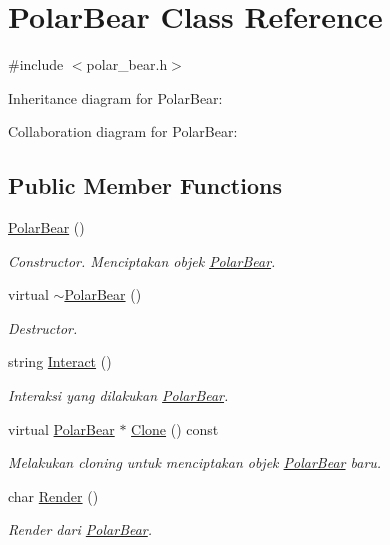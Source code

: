 \hypertarget{classPolarBear}{}\section{Polar\+Bear Class Reference}
\label{classPolarBear}


{\ttfamily \#include $<$polar\+\_\+bear.\+h$>$}



Inheritance diagram for Polar\+Bear\+:


Collaboration diagram for Polar\+Bear\+:
\subsection*{Public Member Functions}
\begin{DoxyCompactItemize}
\item 
\hyperlink{classPolarBear_a646f53f9fa472dcc7873e6a912cbc474}{Polar\+Bear} ()
\begin{DoxyCompactList}\small\item\em Constructor. Menciptakan objek \hyperlink{classPolarBear}{Polar\+Bear}. \end{DoxyCompactList}\item 
virtual \hyperlink{classPolarBear_a84e510e1476910f33cbb0bbe2fff3566}{$\sim$\+Polar\+Bear} ()
\begin{DoxyCompactList}\small\item\em Destructor. \end{DoxyCompactList}\item 
string \hyperlink{classPolarBear_a2c266e69dd929ac3b10fe7484a77a5a4}{Interact} ()
\begin{DoxyCompactList}\small\item\em Interaksi yang dilakukan \hyperlink{classPolarBear}{Polar\+Bear}. \end{DoxyCompactList}\item 
virtual \hyperlink{classPolarBear}{Polar\+Bear} $\ast$ \hyperlink{classPolarBear_aad58cdb9b360996a94f12ade5b6743b7}{Clone} () const 
\begin{DoxyCompactList}\small\item\em Melakukan cloning untuk menciptakan objek \hyperlink{classPolarBear}{Polar\+Bear} baru. \end{DoxyCompactList}\item 
char \hyperlink{classPolarBear_a7feccf8999fb0ab000c052583ad0217a}{Render} ()
\begin{DoxyCompactList}\small\item\em Render dari \hyperlink{classPolarBear}{Polar\+Bear}. \end{DoxyCompactList}\end{DoxyCompactItemize}
